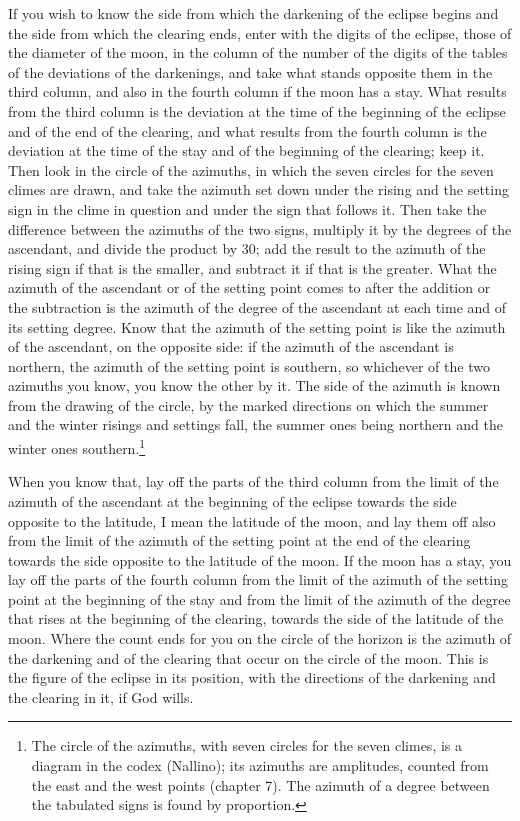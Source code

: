 \documentclass[11pt]{article}
\newcommand{\ArPage}[1]{\marginpar{\footnotesize\color{gray}Ar.\,p.\,#1}}
\begin{document}
\par If you wish to know the side from which the darkening of the eclipse begins and the side from which the clearing ends, enter with the digits of the eclipse, those of the diameter of the moon, in the column of the number of the digits of the tables of the deviations of the darkenings, and take what stands opposite them in the third column, and also in the fourth column if the moon has a stay. What results from the third column is the deviation at the time of the beginning of the eclipse and of the end of the clearing, and what results from the fourth column is the deviation at the time of the stay and of the beginning of the clearing; keep it. Then look in the circle of the azimuths, in which the seven circles for the seven climes are drawn, and take the azimuth set down under the rising and the setting sign in the clime in question and under the sign that follows it. Then take the difference between the azimuths of the two signs, multiply it by the degrees of the ascendant, and divide the product by 30; add the result to the azimuth of the rising sign if that is the smaller, and subtract it if that is the greater. What the azimuth of the ascendant or of the setting point comes to after the addition or the subtraction is the azimuth of the degree of the ascendant at each time and of its setting degree. Know that the azimuth of the setting point is like the azimuth of the ascendant, on the opposite side: if the azimuth of the ascendant is northern, the azimuth of the setting point is southern, so whichever of the two azimuths you know, you know the other by it. The side of the azimuth is known from the drawing of the circle, by the marked directions on which the summer and the winter risings and settings fall, the summer ones being northern and the winter ones southern.\footnote{The circle of the azimuths, with seven circles for the seven climes, is a diagram in the codex (Nallino); its azimuths are amplitudes, counted from the east and the west points (chapter 7). The azimuth of a degree between the tabulated signs is found by proportion.}\par
\par \ArPage{154}When you know that, lay off the parts of the third column from the limit of the azimuth of the ascendant at the beginning of the eclipse towards the side opposite to the latitude, I mean the latitude of the moon, and lay them off also from the limit of the azimuth of the setting point at the end of the clearing towards the side opposite to the latitude of the moon. If the moon has a stay, you lay off the parts of the fourth column from the limit of the azimuth of the setting point at the beginning of the stay and from the limit of the azimuth of the degree that rises at the beginning of the clearing, towards the side of the latitude of the moon. Where the count ends for you on the circle of the horizon is the azimuth of the darkening and of the clearing that occur on the circle of the moon. This is the figure of the eclipse in its position, with the directions of the darkening and the clearing in it, if God wills.\par
\end{document}
